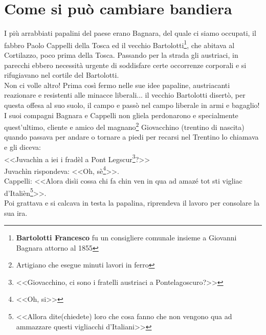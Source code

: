 
\chapter{Come si può cambiare bandiera}
I più arrabbiati papalini del paese erano Bagnara, del quale ci siamo occupati, il fabbro Paolo Cappelli della Tosca ed il vecchio Bartolotti\footnote{\textbf{Bartolotti Francesco} fu un consigliere comunale insieme a Giovanni Bagnara attorno al 1855}, che abitava al Cortilazzo, poco prima della Tosca. Passando per la strada gli austriaci, in parecchi ebbero necessità urgente di soddisfare certe occorrenze corporali e si rifugiavano nel cortile del Bartolotti.\\
\indent Non ci volle altro! Prima così fermo nelle sue idee papaline, austriacanti reazionare e resistenti alle minacce liberali... il vecchio Bartolotti disertò, per questa offesa al suo suolo, il campo e passò nel campo liberale in armi e bagaglio!\\
\indent I suoi compagni Bagnara e Cappelli non gliela perdonarono e specialmente quest'ultimo, cliente e amico del magnano\footnote{Artigiano che esegue minuti lavori in ferro} Giovacchino (trentino di nascita) quando passava per andare o tornare a piedi per recarsi nel Trentino lo chiamava e gli diceva:\\
\indent <<Juvachìn a iei i fradèl a Pont Legscur\footnote{<<Giovacchino, ci sono i fratelli austriaci a Pontelagoscuro?>>}?>>\\
\indent Juvachìn rispondeva: <<Oh, sè\footnote{<<Oh, si>>}>>.\\
\indent {}Cappelli: <<Alora disìi cossa chi fa chin ven in qua ad amazé tot sti vigliac d'Italièn\footnote{<<Allora dite(chiedete) loro che cosa fanno che non vengono qua ad ammazzare questi vigliacchi d'Italiani>>}>>.\\
\indent Poi grattava e si calcava in testa la papalina, riprendeva il lavoro per consolare la sua ira.


